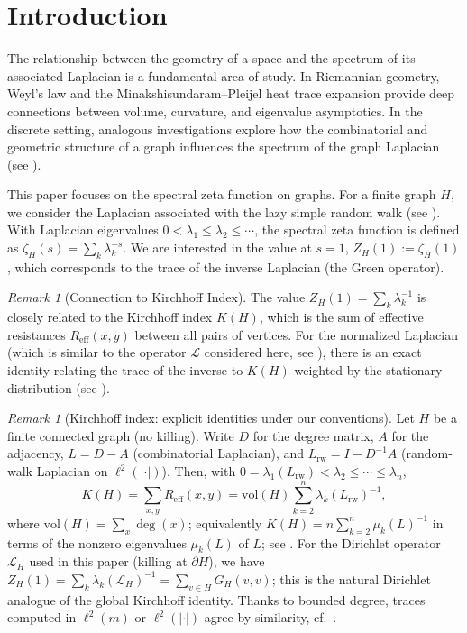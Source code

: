 \documentclass{article}
\numberwithin{equation}{section}
\theoremstyle{definition}
\theoremstyle{remark}
\newtheorem{remark}[theorem]{Remark}
\newcommand{\LL}{\mathcal{L}}
\newcommand{\Reff}{R_{\mathrm{eff}}}
\begin{document}
\section{Introduction}

The relationship between the geometry of a space and the spectrum of its associated Laplacian is a fundamental area of study. In Riemannian geometry, Weyl's law and the Minakshisundaram--Pleijel heat trace expansion provide deep connections between volume, curvature, and eigenvalue asymptotics. In the discrete setting, analogous investigations explore how the combinatorial and geometric structure of a graph influences the spectrum of the graph Laplacian (see \cite{Chung97}).

This paper focuses on the spectral zeta function on graphs. For a finite graph $H$, we consider the Laplacian associated with the lazy simple random walk (see ). With Laplacian eigenvalues $0 < \lambda_1 \leq \lambda_2 \leq \cdots$, the spectral zeta function is defined as $\zeta_H(s) = \sum_k \lambda_k^{-s}$. We are interested in the value at $s=1$, $Z_H(1) := \zeta_H(1)$, which corresponds to the trace of the inverse Laplacian (the Green operator).

\begin{remark}[Connection to Kirchhoff Index]\label{rem:kirchhoff}
The value $Z_H(1) = \sum_k \lambda_k^{-1}$ is closely related to the Kirchhoff index $K(H)$, which is the sum of effective resistances $\Reff(x,y)$ between all pairs of vertices. For the normalized Laplacian (which is similar to the operator $\LL$ considered here, see ), there is an exact identity relating the trace of the inverse to $K(H)$ weighted by the stationary distribution (see \cite[Chapter 9]{LyonsPeres16}).
\end{remark}

\begin{remark}[Kirchhoff index: explicit identities under our conventions]\label{rem:kirchhoff-precise}
Let $H$ be a finite connected graph (no killing). Write $D$ for the degree matrix, $A$ for the adjacency, $L=D-A$ (combinatorial Laplacian), and $L_{\mathrm{rw}}=I-D^{-1}A$ (random-walk Laplacian on $\ell^2(|\cdot|)$). Then, with $0=\lambda_1(L_{\mathrm{rw}})<\lambda_2\le\cdots\le\lambda_n$,
\[
  K(H)=\sum_{x,y}\Reff(x,y)=\mathrm{vol}(H)\sum_{k=2}^n \lambda_k(L_{\mathrm{rw}})^{-1},
\]
where $\mathrm{vol}(H)=\sum_{x}\deg(x)$; equivalently $K(H)=n\sum_{k=2}^n \mu_k(L)^{-1}$ in terms of the nonzero eigenvalues $\mu_k(L)$ of $L$; see \cite[Thm.~9.23]{LyonsPeres16}. For the Dirichlet operator $\LL_H$ used in this paper (killing at $\partial H$), we have $Z_H(1)=\sum_k\lambda_k(\LL_H)^{-1}=\sum_{v\in H}G_H(v,v)$; this is the natural Dirichlet analogue of the global Kirchhoff identity. Thanks to bounded degree, traces computed in $\ell^2(m)$ or $\ell^2(|\cdot|)$ agree by similarity, cf.\ .
\end{remark}
\end{document}
